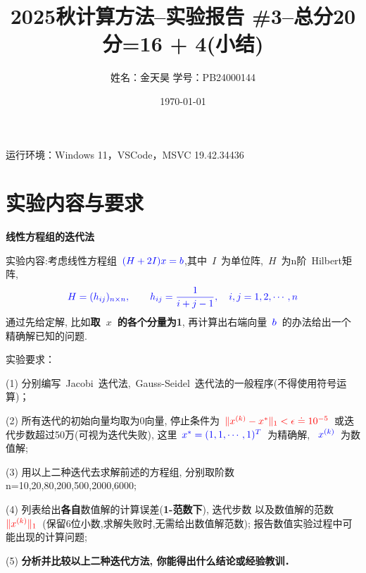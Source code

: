 \documentclass[UTF8]{ctexart}
\title{\bf 2025秋计算方法--实验报告 \#3--总分20分=16 + 4(小结)}
\author{姓名：金天昊 \quad 学号：PB24000144 }
\date{\today}
\begin{document}
\maketitle

运行环境：Windows 11，VSCode，MSVC 19.42.34436

\section{实验内容与要求}
\bf
{线性方程组的迭代法}



{\color{blue} 实验内容}:考虑线性方程组~$\color{blue}{(H + 2 I )x = b}$,其中~$I$~为单位阵,~$H$~为n阶~{\color{blue}Hilbert矩阵},%
$$\color{blue}{ H=(h_{ij})_{n\times n}, \qquad  h_{ij}=\frac{1}{i+j-1},\quad i,j=1,2,\cdots,n  }$$
通过先给{\color{blue}定解}, 比如{\color{red}\bf 取~$x$~的各个分量为1}, 再计算出右端向量~$\color{blue}b$~的办法给出一个精确解已知的问题.

{\color{blue} 实验要求}：

(1) 分别编写~Jacobi~迭代法,~Gauss-Seidel~迭代法的一般程序({\color{red}不得使用符号运算})；

(2) 所有迭代的{\color{blue}初始向量均取为0向量, 停止条件为~$\color{red}\|x^{(k)}  - x^{*} \|_1 < \epsilon \doteq  10^{-5}$~或迭代步数超过50万(可视为迭代失败)},
这里~$\color{blue}x^{*}=(1,1,\cdots,1)^T$~为精确解, ~$\color{blue} x^{(k)}$~为数值解;

(3) 用以上二种迭代去求解前述的方程组,
分别取阶数~{\color{red} n=10,20,80,200,500,2000,6000};

(4) 列表给出{\bf 各自}{\color{blue}数值解}的计算误差({\bf\color{red}1-范数下}), {\color{blue}迭代步数}
以及{\color{blue}数值解}的范数~$\color{red}\|x^{(k)} \|_1$~(保留6位小数,求解失败时,无需给出数值解范数);
    报告数值实验过程中可能出现的计算问题;

%
(5) {\bf 分析并比较以上二种迭代方法, 你能得出什么结论或经验教训．}
\clearpage
\end{document}
